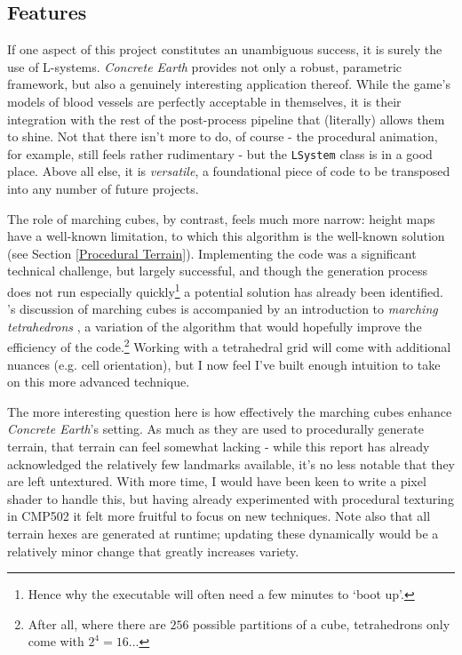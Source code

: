 \documentclass[a4paper, 11pt]{article}
\begin{document}
\begin{flushleft}
\subsection{Features}

If one aspect of this project constitutes an unambiguous success, it is surely the use of L-systems. \textit{Concrete Earth} provides not only a robust, parametric framework, but also a genuinely interesting application thereof. While the game's models of blood vessels are perfectly acceptable in themselves, it is their integration with the rest of the post-process pipeline that (literally) allows them to shine. Not that there isn't more to do, of course - the procedural animation, for example, still feels rather rudimentary - but the \texttt{LSystem} class is in a good place. Above all else, it is \textit{versatile}, a foundational piece of code to be transposed into any number of future projects.

\vspace{5pt}\noindent
The role of marching cubes, by contrast, feels much more narrow: height maps have a well-known limitation, to which this algorithm is the well-known solution (see Section \ref{Procedural Terrain}). Implementing the code was a significant technical challenge, but largely successful, and though the generation process does not run especially quickly\footnote{Hence why the executable will often need a few minutes to `boot up'.} a potential solution has already been identified. \citeauthor{bourkeMarchingTetrahedrons}'s discussion of marching cubes is accompanied by an introduction to \textit{marching tetrahedrons} \citeyearpar{bourkeMarchingTetrahedrons}, a variation of the algorithm that would hopefully improve the efficiency of the code.\footnote{After all, where there are $256$ possible partitions of a cube, tetrahedrons only come with $2^4 = 16$...} Working with a tetrahedral grid will come with additional nuances (e.g. cell orientation), but I now feel I've built enough intuition to take on this more advanced technique. %

\vspace{5pt}\noindent
The more interesting question here is how effectively the marching cubes enhance \textit{Concrete Earth}'s setting. As much as they are used to procedurally generate terrain, that terrain can feel somewhat lacking - while this report has already acknowledged the relatively few landmarks available, it's no less notable that they are left untextured. With more time, I would have been keen to write a pixel shader to handle this, but having already experimented with procedural texturing in CMP502 it felt more fruitful to focus on new techniques. Note also that all terrain hexes are generated at runtime; updating these dynamically would be a relatively minor change that greatly increases variety.


\end{flushleft}
\end{document}

